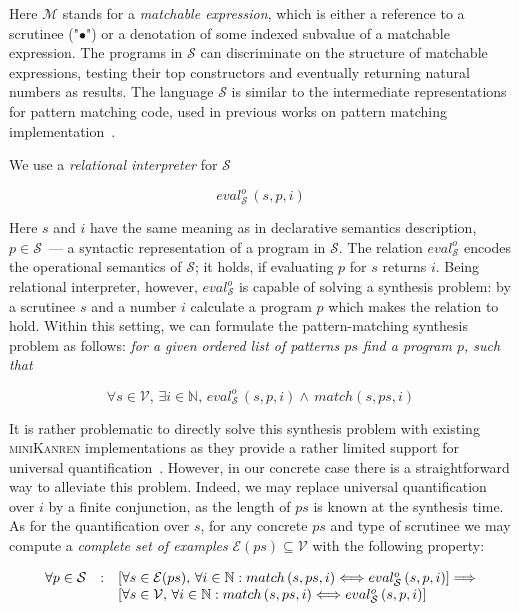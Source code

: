 \documentclass[submission,copyright,creativecommons]{eptcs}
\def\transarrow{\xrightarrow}
\newcommand{\setarrow}[1]{\def\transarrow{#1}}
\def\padding{\phantom{X}}
\def\subarrow{}
\newcommand{\setsubarrow}[1]{\def\subarrow{#1}}
\newcommand{\withenv}[2]{{#1}\vdash{#2}}
\newcommand{\trans}[3]{{#1}\transarrow{\padding{\textstyle #2}\padding}\subarrow{#3}}
\newcommand{\inbr}[1]{\left<{#1}\right>}
\newcommand{\ir}{\ensuremath{\mathcal{S}}}
\begin{document}
Here $\mathcal{M}$ stands for a \emph{matchable expression}, which is either a reference to a scrutinee ("$\bullet$") or
a denotation of some indexed subvalue of a matchable expression. The programs in $\ir$ can discriminate on the
structure of matchable expressions, testing their top constructors and eventually returning natural numbers as results.
The language $\ir$ is similar to the intermediate representations for pattern matching code, used in 
previous works on pattern matching implementation~\cite{maranget2001,maranget2008}.

We use a \emph{relational interpreter} for $\ir$

\[
eval^o_{\ir}\, (s, p, i)
\]

Here $s$ and $i$ have the same meaning as in declarative semantics description, $p\in\ir$~--- a syntactic representation of
a program in $\ir$. The relation $eval^o_{\ir}$ encodes the operational semantics of $\ir$; it holds, if
evaluating $p$ for $s$ returns $i$. Being relational interpreter, however, $eval^o_{\ir}$ is capable of solving a
synthesis problem: by a scrutinee $s$ and a number $i$ calculate a program $p$ which makes the relation to hold.
Within this setting, we can formulate the pattern-matching synthesis problem as follows: \emph{for a given ordered list of patterns $ps$ find a program $p$, such that}

\[
\forall s\in\mathcal{V},\,\exists i\in\mathbb{N},\,eval^o_{\ir}\, (s, p, i) \wedge\, match (s, ps, i)
\]

It is rather problematic to directly solve this synthesis problem with existing \textsc{miniKanren} implementations as
they provide a rather limited support for universal quantification~\cite{eigen,moiseenko}. However, in our concrete
case there is a straightforward way to alleviate this problem. Indeed, we may replace universal quantification over $i$ by
a finite conjunction, as the length of $ps$ is known at the synthesis time. As for the quantification over $s$, for
any concrete $ps$ and type of scrutinee we may compute a \emph{complete set of examples} $\mathcal{E}(ps)\subseteq\mathcal{V}$ with the following
property:


\[
\setarrow{\xrightarrow}
\begin{array}{rcl}
  \forall p\in\mathcal S & : & [\forall s\in\mathcal{E}(ps),\,\forall i\in\mathbb{N} : 
  match\, (s, ps, i)
  \Longleftrightarrow
  eval^o_{\ir}\, (s, p, i) 
  ] \Longrightarrow \\
                          &   & [\forall s\in\mathcal V,\,\forall i\in\mathbb{N} : %
                          match\, (s, ps, i)
                           \Longleftrightarrow  %
                          eval^o_{\ir}\, (s, p, i) 
                          ]
\end{array}
\]
\end{document}
